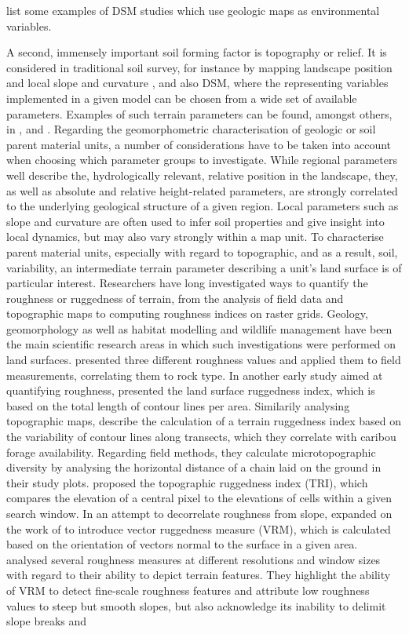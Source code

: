 \documentclass[preprint,12pt,authoryear]{elsarticle}
\begin{document}
\cite{McBratney2003} list some examples of DSM studies which use geologic maps as environmental variables.

A second, immensely important soil forming factor is topography or relief. It is considered in traditional soil survey, for instance by mapping landscape position and local slope and curvature \citep{FAO2006}, and also DSM, where the representing variables implemented in a given model can be chosen from a wide set of available parameters. Examples of such terrain parameters can be found, amongst others, in \cite{Boehner2009},\cite{Gallant2000} and \cite{Olaya2009141} . Regarding the geomorphometric characterisation of geologic or soil parent material units, a number of considerations have to be taken into account when choosing which parameter groups to investigate. While regional parameters well describe the, hydrologically relevant, relative position in the landscape, they, as well as absolute and relative height-related parameters, are strongly correlated to the underlying geological structure of a given region. Local parameters such as slope and curvature are often used to infer soil properties and give insight into local dynamics, but may also vary strongly within a map unit. To characterise parent material units, especially with regard to topographic, and as a result, soil, variability, an intermediate terrain parameter describing a unit's land surface is of particular interest. Researchers have long investigated ways to quantify the roughness or ruggedness of terrain, from the analysis of field data and topographic maps to computing roughness indices on raster grids. Geology, geomorphology as well as habitat modelling and wildlife management have been the main scientific research areas in which such investigations were performed on land surfaces.  \cite{Hobson1972} presented three different roughness values and applied them to field measurements, correlating them to rock type. In another early study aimed at quantifying roughness, \cite{Beasom1983} presented the land surface ruggedness index, which is based on the total length of contour lines per area. Similarily analysing topographic maps, \cite{Nellemann1994} describe the calculation of a terrain ruggedness index based on the variability of contour lines along transects, which they correlate with caribou forage availability. Regarding field methods, they calculate microtopographic diversity by analysing the horizontal distance of a chain laid on the ground in their study plots. \cite{Riley1999} proposed the topographic ruggedness index (TRI), which compares the elevation of a central pixel to the elevations of cells within a given search window. In an attempt to decorrelate roughness from slope, \cite{Sappington2007} expanded on the work of \cite{Hobson1972} to introduce vector ruggedness measure (VRM), which is calculated based on the orientation of vectors normal to the surface in a given area. \citep{Grohmann2010} analysed several roughness measures at different resolutions and window sizes with regard to their ability to depict terrain features. They highlight the ability of VRM to detect fine-scale roughness features and attribute low roughness values to steep but smooth slopes, but also acknowledge its inability to delimit slope breaks and 
\end{document}
